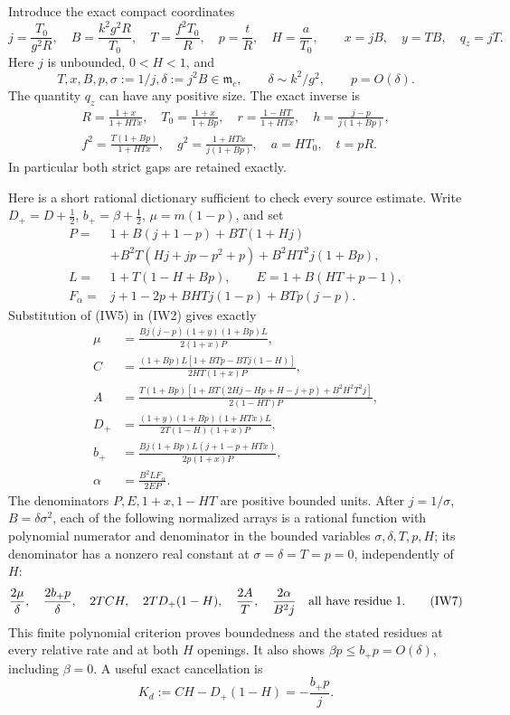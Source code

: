 Introduce the exact compact coordinates
\[
 j=\frac{T_0}{g^2R},\quad B=\frac{k^2g^2R}{T_0},\quad
 T=\frac{f^2T_0}{R},\quad p=\frac tR,\quad H=\frac a{T_0},
 \qquad x=jB,\quad y=TB,\quad q_z=jT.                    \tag{IW3}
\]
Here $j$ is unbounded, $0<H<1$, and
\[
 T,x,B,p,\sigma:=1/j,\delta:=j^2B\in\mathfrak m_c,
 \qquad \delta\sim k^2/g^2,\qquad p=O(\delta).
                                                               \tag{IW4}
\]
The quantity $q_z$ can have any positive size. The exact inverse is
\[
\begin{gathered}
 R=\frac{1+x}{1+HTx},\quad T_0=\frac{1+x}{1+Bp},\quad
 r=\frac{1-HT}{1+HTx},\quad h=\frac{j-p}{j(1+Bp)},\\
 f^2=\frac{T(1+Bp)}{1+HTx},\quad
 g^2=\frac{1+HTx}{j(1+Bp)},\quad a=HT_0,\quad t=pR.
\end{gathered}                                                   \tag{IW5}
\]
In particular both strict gaps are retained exactly.

Here is a short rational dictionary sufficient to check every source
estimate. Write $D_+=D+\tfrac12$, $b_+=\beta+\tfrac12$,
$\mu=m(1-p)$, and set
\[
\begin{split}
 P={}&1+B(j+1-p)+BT(1+Hj)\\
 &+B^2T(Hj+jp-p^2+p)+B^2HT^2j(1+Bp),\\
 L={}&1+T(1-H+Bp),\qquad E=1+B(HT+p-1),\\
 F_\alpha={}&j+1-2p+BHTj(1-p)+BTp(j-p).
\end{split}
\]
Substitution of (IW5) in (IW2) gives exactly
\[
\begin{split}
 \mu&=\frac{Bj(j-p)(1+y)(1+Bp)L}{2(1+x)P},\\
 C&=\frac{(1+Bp)L[1+BTp-BTj(1-H)]}{2HT(1+x)P},\\
 A&=\frac{T(1+Bp)[1+BT(2Hj-Hp+H-j+p)+B^2H^2T^2j]}
              {2(1-HT)P},\\
 D_+&=\frac{(1+y)(1+Bp)(1+HTx)L}{2T(1-H)(1+x)P},\\
 b_+&=\frac{Bj(1+Bp)L(j+1-p+HTx)}{2p(1+x)P},\\
 \alpha&=\frac{B^2LF_\alpha}{2EP}.
\end{split}                                                     \tag{IW6}
\]
The denominators $P,E,1+x,1-HT$ are positive bounded units.
After $j=1/\sigma$, $B=\delta\sigma^2$, each of the following
normalized arrays is a rational function with polynomial numerator
and denominator in the bounded variables $\sigma,\delta,T,p,H$;
its denominator has a nonzero real constant at
$\sigma=\delta=T=p=0$, independently of $H$:
\[
 \frac{2\mu}{\delta},\quad\frac{2b_+p}{\delta},\quad
 2TCH,\quad2TD_+(1-H),\quad\frac{2A}{T},\quad
 \frac{2\alpha}{B^2j}\quad\hbox{all have residue }1.
                                                               \tag{IW7}
\]
This finite polynomial criterion proves boundedness and the stated
residues at every relative rate and at both $H$ openings. It also
shows $\beta p\leq b_+p=O(\delta)$, including $\beta=0$.
A useful exact cancellation is
\[
                  K_d:=CH-D_+(1-H)=-\frac{b_+p}{j}.    \tag{IW8}
\]

